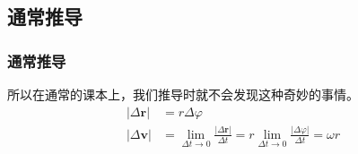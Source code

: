 \documentclass[unicode]{beamer}
\begin{document}
\begin{CJK}{UTF8}{gbsn}
\subsection{通常推导}
    \begin{frame}
    \frametitle{通常推导}
    所以在通常的课本上，我们推导时就不会发现这种奇妙的事情。
    \begin{align}
    |\Delta \mathbf{r}|&=r\Delta\varphi \\
    |\Delta \mathbf{v}|&=\lim_{\Delta t \rightarrow 0} \frac{|\Delta \mathbf{r}|}{\Delta t}= r \lim_{\Delta t \rightarrow 0}\frac{|\Delta \varphi|}{\Delta t}= \omega r
    \end{align}
    \end{frame}

\end{CJK}
\end{document}
